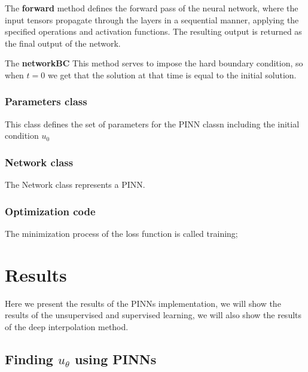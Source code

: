 \documentclass{article}
\begin{document}
The \textbf{forward} method defines the forward pass of the neural network, where the input tensors propagate through the layers in a sequential manner, applying the specified operations and activation functions. The resulting output is returned as the final output of the network.


The \textbf{networkBC} This method serves to impose the hard boundary condition, so when $t=0$ we get that the solution at that time is equal to the initial solution. 

\subsubsection{Parameters class}

This class defines the set of parameters for the PINN classn including the initial condition $u_0$ 

\subsubsection{Network class}

The Network class represents a PINN.


\subsubsection{Optimization code}

The minimization process of the loss function is called training;

\section{Results}
Here we present the results of the PINNs implementation, we will show the results of the unsupervised and supervised learning, we will also show the results of the deep interpolation method.

\subsection{Finding $u_\theta$ using PINNs}
\end{document}
